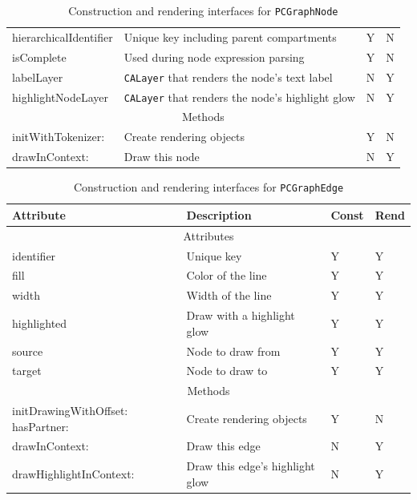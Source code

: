 \begin{table}[htbp]
\begin{tabular}{ p{1.5in} p{3in} p{0.3in} p{0.3in}}
    hierarchicalIdentifier  & Unique key including parent compartments
    & Y & N \\
    isComplete & Used during node expression parsing
    & Y & N \\

    labelLayer  & \texttt{CALayer} that renders the node's text label
    & N & Y \\

    highlightNodeLayer  & \texttt{CALayer} that renders the node's highlight
    glow
    & N & Y \\

    \hline \multicolumn{4}{c}{Methods} \\ \hline

    initWithTokenizer: & Create rendering objects
    & Y & N \\

    drawInContext: & Draw this node
    & N & Y \\
\end{tabular}

    \label{fig:smda_node_interface}
    \caption{Construction and rendering interfaces for \texttt{PCGraphNode}}
\end{table}

\begin{table}[htbp]
\centering
\begin{tabular}{ p{1.5in} p{3in} p{0.3in} p{0.3in}}
    Attribute & Description & Const & Rend \\ \hline
    \hline \multicolumn{4}{c}{Attributes} \\ \hline

    identifier & Unique key  & Y & Y \\
    fill & Color of the line & Y & Y \\
    width & Width of the line & Y & Y \\
    highlighted & Draw with a highlight glow & Y & Y \\

    source & Node to draw from & Y & Y \\
    target & Node to draw to & Y & Y \\

    \hline \multicolumn{4}{c}{Methods} \\ \hline

    initDrawingWithOffset: hasPartner: & Create rendering objects
    & Y & N \\

    drawInContext: & Draw this edge
    & N & Y \\

    drawHighlightInContext: & Draw this edge's highlight glow
    & N & Y \\
\end{tabular}

    \label{fig:smda_edge_interface}
    \caption{Construction and rendering interfaces for \texttt{PCGraphEdge}}
\end{table}

